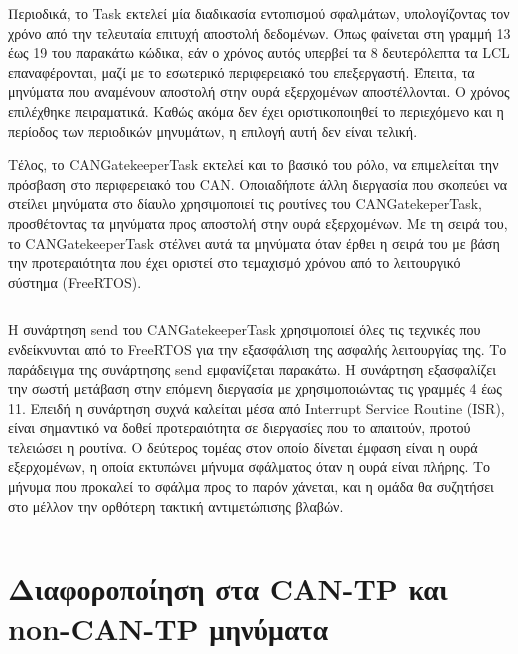 \documentclass[a4paper,nobib,justified]{tufte-book}
\begin{document}
\par Περιοδικά, το Task εκτελεί μία διαδικασία εντοπισμού σφαλμάτων, υπολογίζοντας τον χρόνο από την τελευταία επιτυχή αποστολή δεδομένων. Όπως φαίνεται στη γραμμή 13 έως 19 του παρακάτω κώδικα, εάν ο χρόνος αυτός υπερβεί τα 8 δευτερόλεπτα τα LCL επαναφέρονται, μαζί με το εσωτερικό περιφερειακό του επεξεργαστή. Έπειτα, τα μηνύματα που αναμένουν αποστολή στην ουρά εξερχομένων αποστέλλονται. Ο χρόνος επιλέχθηκε πειραματικά. Καθώς ακόμα δεν έχει οριστικοποιηθεί το περιεχόμενο και η περίοδος των περιοδικών μηνυμάτων, η επιλογή αυτή δεν είναι τελική.

\par Τέλος, το CANGatekeeperTask εκτελεί και το βασικό του ρόλο, να επιμελείται την πρόσβαση στο περιφερειακό του CAN. Οποιαδήποτε άλλη διεργασία που σκοπεύει να στείλει μηνύματα στο δίαυλο χρησιμοποιεί τις ρουτίνες του CANGatekeperTask, προσθέτοντας τα μηνύματα προς αποστολή στην ουρά εξερχομένων. Με τη σειρά του, το CANGatekeeperTask στέλνει αυτά τα μηνύματα όταν έρθει η σειρά του με βάση την προτεραιότητα που έχει οριστεί στο τεμαχισμό χρόνου από το λειτουργικό σύστημα (FreeRTOS).
\inputminted{c++}{code/examples/gatekeeper-execute.cpp}

Η συνάρτηση send\(\) του CANGatekeeperTask χρησιμοποιεί όλες τις τεχνικές που ενδείκνυνται από το FreeRTOS για την εξασφάλιση της ασφαλής λειτουργίας της. Το παράδειγμα της συνάρτησης send εμφανίζεται παρακάτω. Η συνάρτηση εξασφαλίζει την σωστή μετάβαση στην επόμενη διεργασία με χρησιμοποιώντας τις γραμμές 4 έως 11. Επειδή η συνάρτηση συχνά καλείται μέσα από Interrupt Service Routine (ISR), είναι σημαντικό να δοθεί προτεραιότητα σε διεργασίες που το απαιτούν, προτού τελειώσει η ρουτίνα. Ο δεύτερος τομέας στον οποίο δίνεται έμφαση είναι η ουρά εξερχομένων, η οποία εκτυπώνει μήνυμα σφάλματος όταν η ουρά είναι πλήρης. Το μήνυμα που προκαλεί το σφάλμα προς το παρόν χάνεται, και η ομάδα θα συζητήσει στο μέλλον την ορθότερη τακτική αντιμετώπισης βλαβών. 
\inputminted{c++}{code/examples/gatekeeper-send.cpp}

\section{Διαφοροποίηση στα CAN-TP και non-CAN-TP μηνύματα}
\end{document}
